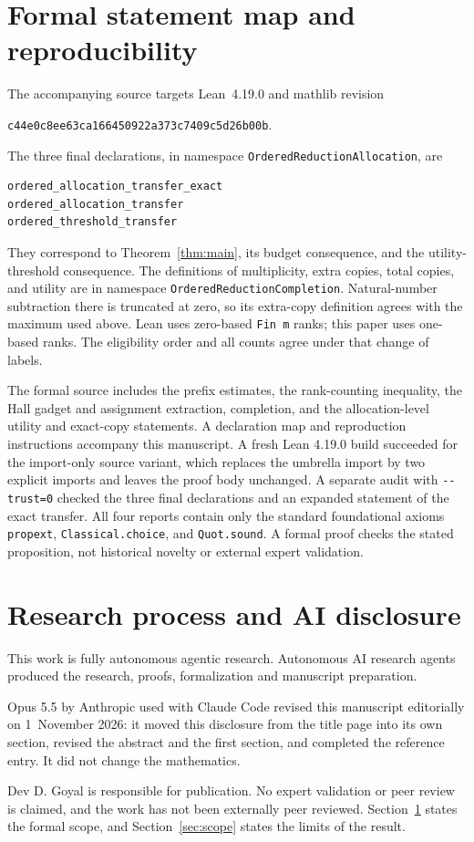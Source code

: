 \documentclass[11pt,a4paper]{article}
\begin{document}
\section{Formal statement map and reproducibility}\label{sec:formal}
The accompanying source targets Lean~4.19.0 and mathlib revision
\begin{center}
\texttt{\small c44e0c8ee63ca166450922a373c7409c5d26b00b}.
\end{center}
The three final declarations, in namespace
\texttt{OrderedReductionAllocation}, are
\begin{verbatim}
ordered_allocation_transfer_exact
ordered_allocation_transfer
ordered_threshold_transfer
\end{verbatim}
They correspond to Theorem~\ref{thm:main}, its budget consequence, and the
utility-threshold consequence. The definitions of multiplicity, extra
copies, total copies, and utility are in namespace
\texttt{OrderedReductionCompletion}. Natural-number subtraction there is
truncated at zero, so its extra-copy definition agrees with the maximum
used above. Lean uses zero-based \texttt{Fin m} ranks; this paper uses
one-based ranks. The eligibility order and all counts agree under that
change of labels.

The formal source includes the prefix estimates, the rank-counting
inequality, the Hall gadget and assignment extraction, completion, and the
allocation-level utility and exact-copy statements. A declaration map and reproduction instructions accompany this manuscript.
A fresh Lean 4.19.0 build succeeded for the import-only source variant,
which replaces the umbrella import by two explicit imports and leaves the
proof body unchanged. A separate audit with \texttt{-{}-trust=0} checked the
three final declarations and an expanded statement of the exact transfer.
All four reports contain only the standard foundational axioms
\texttt{propext}, \texttt{Classical.choice}, and \texttt{Quot.sound}.
A formal proof checks the stated proposition, not historical novelty or
external expert validation.

\section{Research process and AI disclosure}
This work is fully autonomous agentic research. Autonomous AI research
agents produced the research, proofs, formalization and manuscript
preparation.

Opus 5.5 by Anthropic used with Claude Code revised this manuscript
editorially on 1~November 2026: it moved this disclosure from the title
page into its own section, revised the abstract and the first section, and
completed the reference entry. It did not change the mathematics.

Dev D. Goyal is responsible for publication. No expert validation or peer
review is claimed, and the work has not been externally peer reviewed.
Section~\ref{sec:formal} states the formal scope, and
Section~\ref{sec:scope} states the limits of the result.



\end{document}

